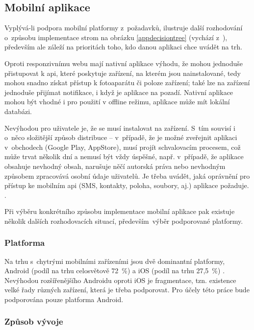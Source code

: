 \documentclass[twoside]{ctuthesis}
\begin{document}
\subsection{Mobilní aplikace}

Vyplývá-li podpora mobilní platformy z~požadavků, ilustruje další rozhodování o~způsobu implementace strom na obrázku \ref{appdecisiontree} (vychází z~\cite{matyunina2020native}), především ale záleží na prioritách toho, kdo danou aplikaci chce uvádět na trh.

Oproti responzivnímu webu mají nativní aplikace výhodu, že mohou jednoduše přistupovat k \acrshort{api}, které poskytuje zařízení, na kterém jsou nainstalované, tedy mohou snadno získat přístup k fotoaparátu či poloze zařízení; také lze na zařízení jednoduše přijímat notifikace, i když je aplikace na pozadí. Nativní aplikace mohou být vhodné i pro použití v offline režimu, aplikace může mít lokální databázi.

Nevýhodou pro uživatele je, že se musí instalovat na zařízení. S~tím souvisí i o~něco složitější způsob distribuce -- v~případě, že je možné zveřejnit aplikaci v~obchodech (Google Play, AppStore), musí projít schvalovacím procesem, což může trvat několik dní a nemusí být vždy úspěšné, např. v~případě, že aplikace obsahuje nevhodný obsah, narušuje něčí autorská práva nebo nevhodným způsobem zpracovává osobní údaje uživatelů. Je třeba uvádět, jaká oprávnění pro přístup ke mobilním \acrshort{api} (SMS, kontakty, poloha, soubory, aj.) aplikace požaduje. \cite{google2021policy}.

Při výběru konkrétního způsobu implementace mobilní aplikace pak existuje několik dalších rozhodovacích situací, především~výběr podporované platformy.

\subsubsection{Platforma}
Na trhu s~chytrými mobilními zařízeními jsou dvě dominantní platformy, Android (podíl na trhu celosvětově 72~\%) a iOS (podíl na trhu 27,5~\%) \cite{statcounter2021mobile}. Nevýhodou rozšířenějšího Androidu oproti iOS je fragmentace, tzn. existence velké řady různých zařízení, která je třeba podporovat. Pro účely této práce bude podporována pouze platforma Android.


\subsubsection{Způsob vývoje}
\end{document}
